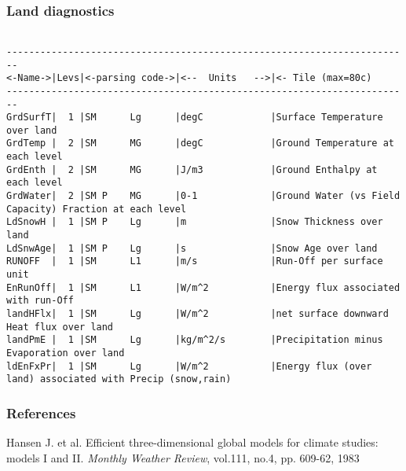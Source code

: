 \subsubsection{Land diagnostics}
\label{sec:pkg:land:diagnostics}

{\footnotesize
\begin{verbatim}

------------------------------------------------------------------------
<-Name->|Levs|<-parsing code->|<--  Units   -->|<- Tile (max=80c) 
------------------------------------------------------------------------
GrdSurfT|  1 |SM      Lg      |degC            |Surface Temperature over land
GrdTemp |  2 |SM      MG      |degC            |Ground Temperature at each level
GrdEnth |  2 |SM      MG      |J/m3            |Ground Enthalpy at each level
GrdWater|  2 |SM P    MG      |0-1             |Ground Water (vs Field Capacity) Fraction at each level
LdSnowH |  1 |SM P    Lg      |m               |Snow Thickness over land
LdSnwAge|  1 |SM P    Lg      |s               |Snow Age over land
RUNOFF  |  1 |SM      L1      |m/s             |Run-Off per surface unit
EnRunOff|  1 |SM      L1      |W/m^2           |Energy flux associated with run-Off
landHFlx|  1 |SM      Lg      |W/m^2           |net surface downward Heat flux over land
landPmE |  1 |SM      Lg      |kg/m^2/s        |Precipitation minus Evaporation over land
ldEnFxPr|  1 |SM      Lg      |W/m^2           |Energy flux (over land) associated with Precip (snow,rain)
\end{verbatim}
}

\subsubsection{References}

Hansen J. et al. Efficient three-dimensional global models for climate
studies: models I and II. \emph{Monthly Weather Review}, vol.111, no.4, pp.
609-62, 1983

% 
